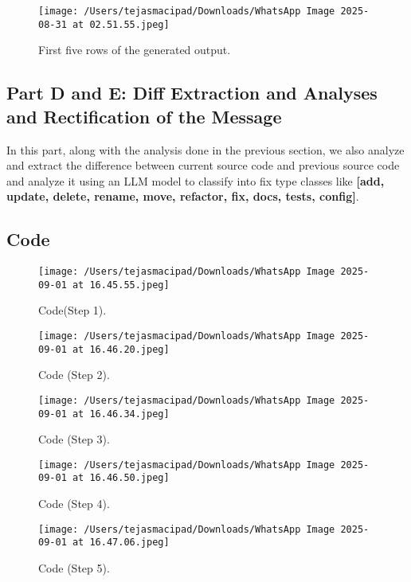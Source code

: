 \documentclass[12pt,a4paper]{article}
\begin{document}
\begin{figure}[h!]
    \centering
    \texttt{[image: /Users/tejasmacipad/Downloads/WhatsApp Image 2025-08-31 at 02.51.55.jpeg]}
    \caption{First five rows of the generated output.}
\end{figure}

\newpage

\subsection*{Part D and E: Diff Extraction and Analyses and Rectification of the Message}
In this part, along with the analysis done in the previous section, we also analyze and extract the difference between current source code and previous source code and analyze it using an LLM model to classify into fix type classes like \textbf{[add, update, delete, rename, move, refactor, fix, docs, tests, config]}.

\subsection*{Code}

\begin{figure}[h!]
    \centering
    \texttt{[image: /Users/tejasmacipad/Downloads/WhatsApp Image 2025-09-01 at 16.45.55.jpeg]}
    \caption{Code(Step 1).}
\end{figure}

\begin{figure}[h!]
    \centering
    \texttt{[image: /Users/tejasmacipad/Downloads/WhatsApp Image 2025-09-01 at 16.46.20.jpeg]}
    \caption{Code (Step 2).}
\end{figure}

\begin{figure}[h!]
    \centering
    \texttt{[image: /Users/tejasmacipad/Downloads/WhatsApp Image 2025-09-01 at 16.46.34.jpeg]}
    \caption{Code (Step 3).}
\end{figure}

\begin{figure}[h!]
    \centering
    \texttt{[image: /Users/tejasmacipad/Downloads/WhatsApp Image 2025-09-01 at 16.46.50.jpeg]}
    \caption{Code (Step 4).}
\end{figure}

\begin{figure}[h!]
    \centering
    \texttt{[image: /Users/tejasmacipad/Downloads/WhatsApp Image 2025-09-01 at 16.47.06.jpeg]}
    \caption{Code (Step 5).}
\end{figure}
\end{document}
